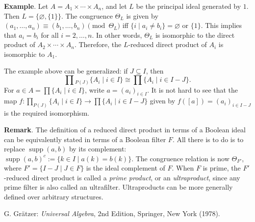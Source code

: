 \documentclass[12pt]{article}
\begin{document}
\textbf{Example}.  Let $A=A_1\times \cdots \times A_n$, and let $L$ be the principal ideal generated by $1$.  Then $L=\lbrace \varnothing, \lbrace 1\rbrace\rbrace$.  The congruence $\Theta_L$ is given by $(a_1,\ldots,a_n)\equiv (b_1,\ldots, b_n)\pmod {\Theta_L}$ iff $\lbrace i\mid a_i\ne b_i\rbrace =\varnothing$ or $\lbrace 1\rbrace$.  This implies that $a_i=b_i$ for all $i=2,\ldots,n$.  In other words, $\Theta_L$ is isomorphic to the direct product of $A_2\times\cdots\times A_n$.  Therefore, the $L$-reduced direct product of $A_i$ is isomorphic to $A_1$.  

The example above can be generalized:  if $J\subseteq I$, then $$\prod {}_{P(J)} \lbrace A_i\mid i\in I\rbrace \cong \prod \lbrace A_i\mid i\in I-J\rbrace.$$  For $a\in A=\prod \lbrace A_i\mid i\in I\rbrace$, write $a=(a_i)_{i\in I}$.  It is not hard to see that the map $f:\prod_{P(J)} \lbrace A_i\mid i\in I\rbrace \to \prod \lbrace A_i\mid i\in I-J\rbrace$ given by $f([a])=(a_i)_{i\in I-J}$ is the required isomorphism.

\textbf{Remark}.  The definition of a reduced direct product in terms of a Boolean ideal can be equivalently stated in terms of a Boolean filter $F$.  All there is to do is to replace $\operatorname{supp}(a,b)$ by its complement: $\operatorname{supp}(a,b)^c:=\lbrace k\in I\mid a(k)=b(k)\rbrace$.  The congruence relation is now $\Theta_{F'}$, where $F'=\lbrace I-J \mid J\in F\rbrace$ is the ideal complement of $F$.  When $F$ is prime, the $F'$-reduced direct product is called a \emph{prime product}, or an \emph{ultraproduct}, since any prime filter is also called an ultrafilter.  Ultraproducts can be more generally defined over arbitrary structures.

\begin{thebibliography}{7}
 G. Gr\"{a}tzer: {\em Universal Algebra}, 2nd Edition, Springer, New York (1978).
\end{thebibliography}
\end{document}
